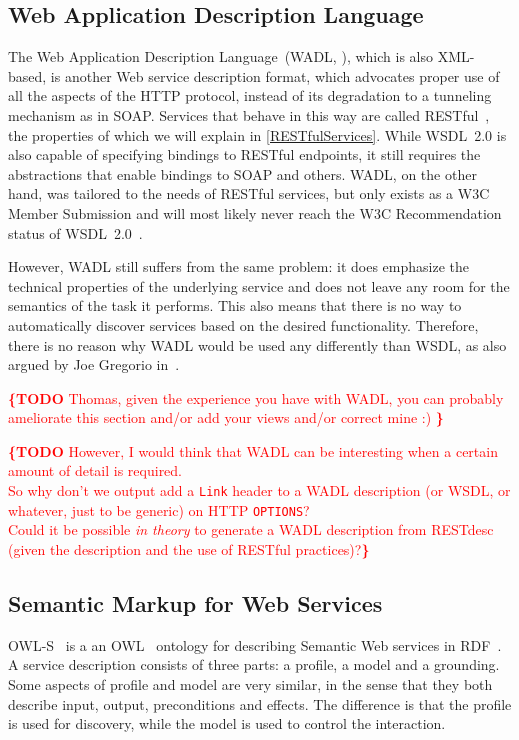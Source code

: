 \documentclass[runningheads,a4paper, twocolumn]{llncs}
\newcommand{\todo}[1]{\noindent\textcolor{red}{{\bf \{TODO} #1{\bf \}}}}
\newcommand{\owls}{\mbox{OWL-S}}
\begin{document}
\subsection{Web Application Description Language}
The Web Application Description Language~(WADL, \cite{WADL}), which is also XML-based, is another Web service description format, which advocates proper use of all the aspects of the HTTP protocol, instead of its degradation to a tunneling mechanism as in SOAP. Services that behave in this way are called RESTful~\cite{FieldingREST}, the properties of which we will explain in \autoref{RESTfulServices}. While WSDL~2.0 is also capable of specifying bindings to RESTful endpoints, it still requires the abstractions that enable bindings to SOAP and others. WADL, on the other hand, was tailored to the needs of RESTful services, but only exists as a W3C Member Submission and will most likely never reach the W3C Recommendation status of WSDL~2.0~\cite{WADLTeamComment}.

However, WADL still suffers from the same problem: it does emphasize the technical properties of the underlying service and does not leave any room for the semantics of the task it performs. This also means that there is no way to automatically discover services based on the desired functionality. Therefore, there is no reason why WADL would be used any differently than WSDL, as also argued by Joe Gregorio in~\cite{GregorioWADL}.

\todo{Thomas, given the experience you have with WADL, you can probably ameliorate this section and/or add your views and/or correct mine :) }

\todo{However, I would think that WADL can be interesting when a certain amount of detail is required.\\
So why don't we output add a \Verb!Link! header to a WADL description (or WSDL, or whatever, just to be generic) on HTTP \Verb!OPTIONS!?\\
Could it be possible {\em in theory} to generate a WADL description from RESTdesc (given the description and the use of RESTful practices)?}

\subsection{Semantic Markup for Web Services}

\owls~\cite{OWLS} is a an OWL~\cite{OWL} ontology for describing Semantic Web services in RDF~\cite{RDF}. A service description consists of three parts: a profile, a model and a grounding. Some aspects of profile and model are very similar, in the sense that they both describe input, output, preconditions and effects. The difference is that the profile is used for discovery, while the model is used to control the interaction.
\end{document}
